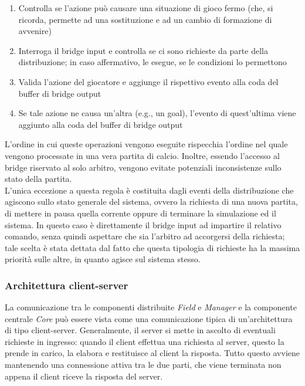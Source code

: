 \begin{enumerate}
	\item Controlla se l'azione può causare una situazione di gioco fermo (che, si ricorda, permette ad una sostituzione e ad un cambio di formazione di avvenire)
	\item Interroga il bridge input e controlla se ci sono richieste da parte della distribuzione; in caso affermativo, le esegue, se le condizioni lo permettono
	\item Valida l'azione del giocatore e aggiunge il rispettivo evento alla coda del buffer di bridge output
	\item Se tale azione ne causa un'altra (e.g., un goal), l'evento di quest'ultima viene aggiunto alla coda del buffer di bridge output
\end{enumerate}

L'ordine in cui queste operazioni vengono eseguite rispecchia l'ordine nel quale vengono processate in una vera partita di calcio. Inoltre, essendo l'accesso al bridge riservato al solo arbitro, vengono evitate potenziali inconsistenze sullo stato della partita.\\

L'unica eccezione a questa regola è costituita dagli eventi della distribuzione che agiscono sullo stato generale del sistema, ovvero la richiesta di una nuova partita, di mettere in pausa quella corrente oppure di terminare la simulazione ed il sistema. In questo caso è direttamente il bridge input ad impartire il relativo comando, senza quindi aspettare che sia l'arbitro ad accorgersi della richiesta; tale scelta è stata dettata dal fatto che questa tipologia di richieste ha la massima priorità sulle altre, in quanto agisce sul sistema stesso.

\subsubsection{Architettura client-server}
\label{sec:analisi_client_server}

La comunicazione tra le componenti distribuite \textit{Field} e \textit{Manager} e la componente centrale \textit{Core} può essere vista come una comunicazione tipica di un'architettura di tipo client-server. Generalmente, il server si mette in ascolto di eventuali richieste in ingresso: quando il client effettua una richiesta al server, questo la prende in carico, la elabora e restituisce al client la risposta. Tutto questo avviene mantenendo una connessione attiva tra le due parti, che viene terminata non appena il client riceve la risposta del server.\\

